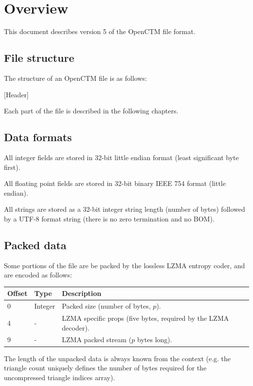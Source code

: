 \tableofcontents



\chapter{Overview}
This document describes version 5 of the OpenCTM file format.

\section{File structure}
The structure of an OpenCTM file is as follows:

[Header]

Each part of the file is described in the following chapters.

\section{Data formats}
All integer fields are stored in 32-bit little endian format (least significant
byte first).

All floating point fields are stored in 32-bit binary IEEE 754 format (little
endian).

All strings are stored as a 32-bit integer string length (number of bytes)
followed by a UTF-8 format string (there is no zero termination and no BOM).

\section{Packed data}
\label{sec:PackedData}
Some portions of the file are be packed by the lossless LZMA entropy coder,
and are encoded as follows:

\begin{tabular}{|l|l|l|}\hline
\textbf{Offset} & \textbf{Type} & \textbf{Description}\\ \hline
0 & Integer & Packed size (number of bytes, $p$).\\ \hline
4 & - & LZMA specific props (five bytes, required by the LZMA decoder).\\ \hline
9 & - & LZMA packed stream ($p$ bytes long).\\ \hline
\end{tabular}

The length of the unpacked data is always known from the context (e.g. the
triangle count uniquely defines the number of bytes required for the
uncompressed triangle indices array).

